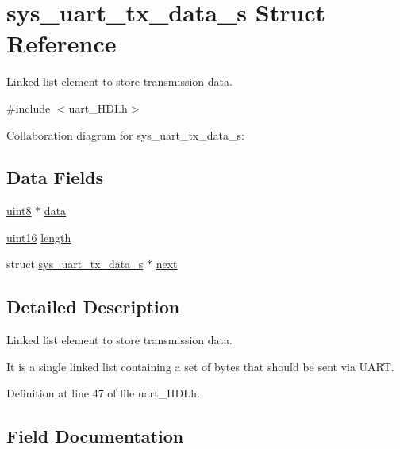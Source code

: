 \hypertarget{structsys__uart__tx__data__s}{}\section{sys\+\_\+uart\+\_\+tx\+\_\+data\+\_\+s Struct Reference}
\label{structsys__uart__tx__data__s}


Linked list element to store transmission data.  




{\ttfamily \#include $<$uart\+\_\+\+H\+D\+I.\+h$>$}



Collaboration diagram for sys\+\_\+uart\+\_\+tx\+\_\+data\+\_\+s\+:
\subsection*{Data Fields}
\begin{DoxyCompactItemize}
\item 
\hyperlink{definitions_8h_adde6aaee8457bee49c2a92621fe22b79}{uint8} $\ast$ \hyperlink{structsys__uart__tx__data__s_a78c6d8a44625afa69057dbf3d2c7013b}{data}
\item 
\hyperlink{definitions_8h_a05f6b0ae8f6a6e135b0e290c25fe0e4e}{uint16} \hyperlink{structsys__uart__tx__data__s_a8722c46cb1b932884a2105316b490328}{length}
\item 
struct \hyperlink{structsys__uart__tx__data__s}{sys\+\_\+uart\+\_\+tx\+\_\+data\+\_\+s} $\ast$ \hyperlink{structsys__uart__tx__data__s_ab931bb63187bc75b8b800a08d902b1ad}{next}
\end{DoxyCompactItemize}


\subsection{Detailed Description}
Linked list element to store transmission data. 

It is a single linked list containing a set of bytes that should be sent via U\+A\+R\+T. 

Definition at line 47 of file uart\+\_\+\+H\+D\+I.\+h.



\subsection{Field Documentation}
\hypertarget{structsys__uart__tx__data__s_a78c6d8a44625afa69057dbf3d2c7013b}{}
